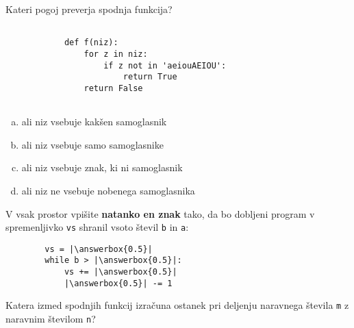 \documentclass[arhiv, 10pt]{../izpit}
\newcommand{\inlinepy}[1]{\texttt{#1}}
\newcommand{\answerbox}[1]{\framebox{\vphantom{\large M}\hspace{#1cm}}}
\begin{document}
        \naloga*

        \begin{multicols}{2}
        \noindent
        Kateri pogoj preverja spodnja funkcija?
        \begin{verbatim}
        
            def f(niz):
                for z in niz:
                    if z not in 'aeiouAEIOU':
                        return True
                return False
            
        \end{verbatim}

        \begin{enumerate}[(a)]
\item ali niz vsebuje kakšen samoglasnik
\item ali niz vsebuje samo samoglasnike
\item ali niz vsebuje znak, ki ni samoglasnik
\item ali niz ne vsebuje nobenega samoglasnika
\end{enumerate}

        \end{multicols}
    
        \naloga*
        \begin{multicols}{2}
        \noindent
        V vsak prostor vpišite \textbf{natanko en znak} tako, da bo dobljeni program v spremenljivko \inlinepy{vs} shranil vsoto števil \inlinepy{b} in \inlinepy{a}:
        
        \columnbreak
        \begin{verbatim}
        vs = |\answerbox{0.5}|
        while b > |\answerbox{0.5}|:
            vs += |\answerbox{0.5}|
            |\answerbox{0.5}| -= 1
        \end{verbatim}
        \end{multicols}
    
        \clearpage
        \naloga
        
        Katera izmed spodnjih funkcij izračuna ostanek pri deljenju naravnega števila \inlinepy{m} z naravnim številom \inlinepy{n}?
    
\end{document}
